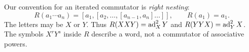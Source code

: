 Our convention for an iterated commutator is \emph{right nesting}:
\begin{equation}\label{eq:right-word}
 R(a_1\cdots a_n)=[a_1,[a_2,\ldots,[a_{n-1},a_n]\ldots]],
 \qquad R(a_1)=a_1.
\end{equation}
The letters may be $X$ or $Y$. Thus $R(XXY)=\operatorname{ad}_X^2Y$ and $R(YYX)=\operatorname{ad}_Y^2X$. The symbols $X^rY^s$ inside $R$ describe a word, not a commutator of associative powers.

